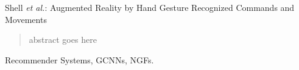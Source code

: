 \documentclass[journal]{IEEEtran}
\begin{document}
%
{Shell \MakeLowercase{\textit{et al.}}: Augmented Reality by Hand Gesture Recognized Commands and Movements}
% 











\maketitle

\begin{abstract}
abstract goes here
\end{abstract}

\begin{IEEEkeywords}
Recommender Systems, GCNNs, NGFs.
\end{IEEEkeywords}






%
\IEEEpeerreviewmaketitle



% 
% 
% 
% 
\end{document}
